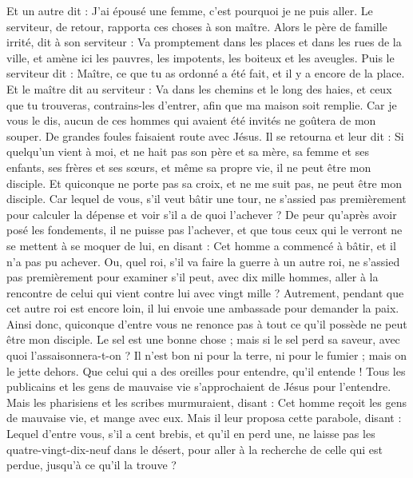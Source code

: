 \begin{multicols}{2}
{Et un autre dit : J’ai épousé une femme, c'est pourquoi je ne puis aller.
Le serviteur, de retour, rapporta ces choses à son maître. Alors le père de famille irrité, dit à son serviteur : Va promptement dans les places et dans les rues de la ville, et amène ici les pauvres, les impotents, les boiteux et les aveugles.
Puis le serviteur dit : Maître, ce que tu as ordonné a été fait, et il y a encore de la place.
Et le maître dit au serviteur : Va dans les chemins et le long des haies, et ceux que tu trouveras, contrains-les d'entrer, afin que ma maison soit remplie.
Car je vous le dis, aucun de ces hommes qui avaient été invités ne goûtera de mon souper.
\TextTitle{[grandeur]}
De grandes foules faisaient route avec Jésus. Il se retourna et leur dit :
Si quelqu'un vient à moi, et ne hait pas son père et sa mère, sa femme et ses enfants, ses frères et ses sœurs, et même sa propre vie, il ne peut être mon disciple.
Et quiconque ne porte pas sa croix, et ne me suit pas, ne peut être mon disciple.
\TextTitle{[grandeur]}
Car lequel de vous, s’il veut bâtir une tour, ne s’assied pas premièrement pour calculer la dépense et voir s'il a de quoi l'achever ?
De peur qu'après avoir posé les fondements, il ne puisse pas l’achever, et que tous ceux qui le verront ne se mettent à se moquer de lui,
en disant : Cet homme a commencé à bâtir, et il n'a pas pu achever.
\TextTitle{[grandeur]}
Ou, quel roi, s’il va faire la guerre à un autre roi, ne s’assied pas premièrement pour examiner s’il peut, avec dix mille hommes, aller à la rencontre de celui qui vient contre lui avec vingt mille ?
Autrement, pendant que cet autre roi est encore loin, il lui envoie une ambassade pour demander la paix.
Ainsi donc, quiconque d’entre vous ne renonce pas à tout ce qu'il possède ne peut être mon disciple.
\TextTitle{[grandeur]}
Le sel est une bonne chose ; mais si le sel perd sa saveur, avec quoi l’assaisonnera-t-on ?
Il n'est bon ni pour la terre, ni pour le fumier ; mais on le jette dehors. Que celui qui a des oreilles pour entendre, qu'il entende !
\VerseOne{}Tous les publicains et les gens de mauvaise vie s'approchaient de Jésus pour l'entendre.
Mais les pharisiens et les scribes murmuraient, disant : Cet homme reçoit les gens de mauvaise vie, et mange avec eux.
\TextTitle{[grandeur]}
Mais il leur proposa cette parabole, disant :
Lequel d'entre vous, s’il a cent brebis, et qu’il en perd une, ne laisse pas les quatre-vingt-dix-neuf dans le désert, pour aller à la recherche de celle qui est perdue, jusqu'à ce qu'il la trouve ?
}
\end{multicols}
